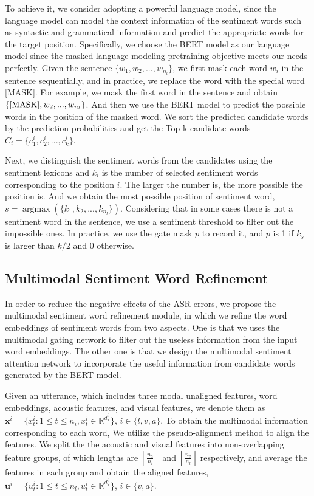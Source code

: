 \documentclass[11pt]{article}
\begin{document}
To achieve it, we consider adopting a powerful language model, since the language model can model the context information of the sentiment words such as syntactic and grammatical information and predict the appropriate words for the target position. Specifically, we choose the BERT model \cite{devlin-etal-2019-bert} as our language model since the masked language modeling pretraining objective meets our needs perfectly. Given the sentence $\{w_1, w_2, ..., w_{n_l}\}$, we first mask each word $w_i$ in the sentence sequentially, and in practice, we replace the word with the special word [MASK]. For example, we mask the first word in the sentence and obtain $\{{\rm [MASK]}, w_2, ..., w_{n_l}\}$. And then we use the BERT model to predict the possible words in the position of the masked word. We sort the predicted candidate words by the prediction probabilities and get the Top-k candidate words $C_i = \{c_1^i, c_2^i, ... ,c_k^i\}$.   

Next, we distinguish the sentiment words from the candidates using the sentiment lexicons \cite{hu2004mining, wilson2005recognizing} and $k_i$ is the number of selected sentiment words corresponding to the position $i$. The larger the number is, the more possible the position is. And we obtain the most possible position of sentiment word, $s = \mathop{\arg\max}(\{k_1, k_2, ..., k_{n_l}\})$. Considering that in some cases there is not a sentiment word in the sentence, we use a sentiment threshold to filter out the impossible ones. In practice, we use the gate mask $p$ to record it,  and $p$ is 1 if  $k_s$ is larger than $k/2$ and 0 otherwise. 


\subsection{Multimodal Sentiment Word Refinement}

In order to reduce the negative effects of the ASR errors, we propose the multimodal sentiment word refinement module, in which we refine the word embeddings of sentiment words from two aspects. One is that we uses the multimodal gating network to filter out the useless information from the input word embeddings. The other one is that we design the multimodal sentiment attention network to incorporate the useful information from candidate words generated by the BERT model.

Given an utterance, which includes three modal unaligned features, word embeddings, acoustic features, and visual features, we denote them as  $\mathbf x^i=\{x_t^i : 1 \le t \le n_i, x_t^i \in \mathbb R^{d_x^i}\} $, $i \in \{l, v, a\}$. To obtain the multimodal information corresponding to each word, We utilize the pseudo-alignment method to align the features. We split the the acoustic and visual features into non-overlapping feature groups, of which lengths are $\left\lfloor \frac{n_a}{n_l} \right\rfloor$ and $\left\lfloor \frac{n_v}{n_l} \right\rfloor$ respectively, and average the features in each group and obtain the aligned features,  $\mathbf u^i=\{u_t^i : 1 \le t \le n_l, u_t^i \in \mathbb R^{d_x^i}\} $, $i \in \{v, a\}$.
\end{document}
